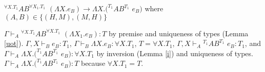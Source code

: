 \begin{case}
$^{\forall X.T_{1}}AB^{\forall X_{1}.T_{1}}$ $(\Lambda X.e_{B})\rightarrow\Lambda X.(^{T_{1}}AB^{T_{1}}$ $e_{B})$ where $(A,B)\in\lbrace(H,M),(M,H)\rbrace$

$\Gamma\vdash_{A}{^{\forall X.T_{1}}A}B^{\forall X.T_{1}}$ $(\Lambda X_{1}.e_{B}):T$ by premise and uniqueness of types (Lemma \ref{uot}).  $\Gamma,X\vdash_{B}e_{B}:T_{1}$, $\Gamma\vdash_{B}\Lambda X.e_{B}:\forall X.T_{1}$, $T=\forall X.T_{1}$, $\Gamma,X\vdash_{A}{^{T_{1}}A}B^{T_{1}}$ $e_{B}:T_{1}$, and $\Gamma\vdash_{A}\Lambda X.(^{T_{1}}AB^{T_{1}}$ $e_{B}):\forall X.T_{1}$ by inversion (Lemma \ref{i}) and uniqueness of types.  $\Gamma\vdash_{A}\Lambda X.(^{T_{1}}AB^{T_{1}}$ $e_{B}):T$ because $\forall X.T_{1}=T$.
\end{case}